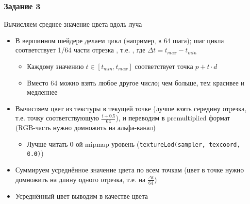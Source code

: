 \documentclass{beamer}
\begin{document}
\begin{frame}[fragile]
\frametitle{Задание 3}
Вычисляем среднее значение цвета вдоль луча
\begin{itemize}
\item В вершинном шейдере делаем цикл (например, в 64 шага); шаг цикла соответствует 1/64 части отрезка \begin{math}[t_{min}, t_{max}]\end{math}, т.е. \begin{math}[t_{min} + \frac{\Delta t \cdot i}{64}, t_{min} + \frac{\Delta t \cdot (i + 1)}{64}]\end{math}, где \begin{math}\Delta t = t_{max} - t_{min}\end{math}
\begin{itemize}
\item Каждому значению \begin{math}t\in[t_{min}, t_{max}]\end{math} соответствует точка \begin{math}p + t \cdot d\end{math}
\item Вместо 64 можно взять любое другое число; чем больше, тем красивее и медленнее
\end{itemize}
\pause
\item Вычисляем цвет из текстуры в текущей точке (лучше взять середину отрезка, т.е. точку соответствующую \begin{math}\frac{i + 0.5}{64}\end{math}), и переводим в premultiplied формат (RGB-часть нужно домножить на альфа-канал)
\begin{itemize}
\item Лучше читать 0-ой mipmap-уровень (\verb|textureLod(sampler, texcoord, 0.0)|)
\end{itemize}
\pause
\item Суммируем усреднённое значение цвета по всем точкам (цвет в точке нужно домножить на длину одного отрезка, т.е. на \begin{math}\frac{\Delta t}{64}\end{math})
\pause
\item Усреднённый цвет выводим в качестве цвета
\end{itemize}
\end{frame}
\end{document}
